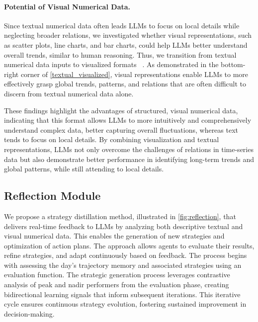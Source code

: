 \vspace{-3pt}

\paragraph{Potential of Visual Numerical Data.}

Since textual numerical data often leads LLMs to focus on local details while neglecting broader relations, we investigated whether visual representations, such as scatter plots, line charts, and bar charts, could help LLMs better understand overall trends, similar to human reasoning. Thus, we transition from textual numerical data inputs to visualized formats ~\citep{storyllava}. As demonstrated in the bottom-right corner of \autoref{textual_visualized}, visual representations enable LLMs to more effectively grasp global trends, patterns, and relations that are often difficult to discern from textual numerical data alone.

These findings highlight the advantages of structured, visual numerical data, indicating that this format allows LLMs to more intuitively and comprehensively understand complex data, better capturing overall fluctuations, whereas text tends to focus on local details. By combining visualization and textual representations, LLMs not only overcome the challenges of relations in time-series data but also demonstrate better performance in identifying long-term trends and global patterns, while still attending to local details.

\subsection{Reflection Module}

We propose a strategy distillation method, illustrated in \autoref{fig:reflection}, that delivers real-time feedback to LLMs by analyzing both descriptive textual and visual numerical data. This enables the generation of new strategies and optimization of action plans. The approach allows agents to evaluate their results, refine strategies, and adapt continuously based on feedback. The process begins with assessing the day’s trajectory memory and associated strategies using an evaluation function. The strategic generation process leverages contrastive analysis of peak and nadir performers from the evaluation phase, creating bidirectional learning signals that inform subsequent iterations. This iterative cycle ensures continuous strategy evolution, fostering sustained improvement in decision-making.

